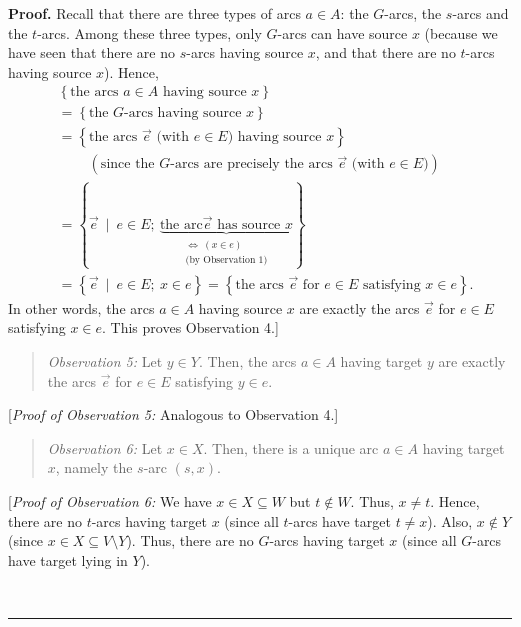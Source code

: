 \documentclass[numbers=enddot,12pt,final,onecolumn,notitlepage]{scrartcl}%
\theoremstyle{definition}
\newenvironment{statement}{\begin{quote}}{\end{quote}}
\newenvironment{proof}[1][Proof]{\noindent\textbf{#1.} }{\ \rule{0.5em}{0.5em}}
\begin{document}
\begin{proof}
Recall that there are three types of arcs $a\in A$: the $G$-arcs, the $s$-arcs
and the $t$-arcs. Among these three types, only $G$-arcs can have source $x$
(because we have seen that there are no $s$-arcs having source $x$, and that
there are no $t$-arcs having source $x$). Hence,%
\begin{align*}
&  \left\{  \text{the arcs }a\in A\text{ having source }x\right\} \\
&  =\left\{  \text{the }G\text{-arcs having source }x\right\} \\
&  =\left\{  \text{the arcs }\overrightarrow{e}\text{ (with }e\in E\text{)
having source }x\right\} \\
&  \ \ \ \ \ \ \ \ \ \ \left(  \text{since the }G\text{-arcs are precisely the
arcs }\overrightarrow{e}\text{ (with }e\in E\text{)}\right) \\
&  =\left\{  \overrightarrow{e}\ \mid\ e\in E;\ \underbrace{\text{the arc
}\overrightarrow{e}\text{ has source }x}_{\substack{\Longleftrightarrow
\ \left(  x\in e\right)  \\\text{(by Observation 1)}}}\right\} \\
&  =\left\{  \overrightarrow{e}\ \mid\ e\in E;\ x\in e\right\}  =\left\{
\text{the arcs }\overrightarrow{e}\text{ for }e\in E\text{ satisfying }x\in
e\right\}  .
\end{align*}
In other words, the arcs $a\in A$ having source $x$ are exactly the arcs
$\overrightarrow{e}$ for $e\in E$ satisfying $x\in e$. This proves Observation 4.]

\begin{statement}
\textit{Observation 5:} Let $y\in Y$. Then, the arcs $a\in A$ having target
$y$ are exactly the arcs $\overrightarrow{e}$ for $e\in E$ satisfying $y\in e$.
\end{statement}

[\textit{Proof of Observation 5:} Analogous to Observation 4.]

\begin{statement}
\textit{Observation 6:} Let $x\in X$. Then, there is a unique arc $a\in A$
having target $x$, namely the $s$-arc $\left(  s,x\right)  $.
\end{statement}

[\textit{Proof of Observation 6:} We have $x\in X\subseteq W$ but $t\notin W$.
Thus, $x\neq t$. Hence, there are no $t$-arcs having target $x$ (since all
$t$-arcs have target $t\neq x$). Also, $x\notin Y$ (since $x\in X\subseteq
V\setminus Y$). Thus, there are no $G$-arcs having target $x$ (since all
$G$-arcs have target lying in $Y$).


\end{proof}
\end{document}
